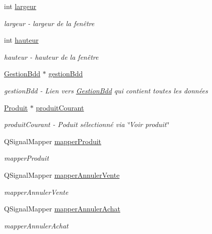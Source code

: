 \begin{DoxyCompactItemize}
int \hyperlink{class_ma_fenetre_abe37db89fd8895cc34ccc0f5cda67aaf}{largeur}
\begin{DoxyCompactList}\small\item\em largeur -\/ largeur de la fenêtre \end{DoxyCompactList}\item 
int \hyperlink{class_ma_fenetre_ae1a802d46705239d08d3bf06cd99b802}{hauteur}
\begin{DoxyCompactList}\small\item\em hauteur -\/ hauteur de la fenêtre \end{DoxyCompactList}\item 
\hyperlink{class_gestion_bdd}{Gestion\-Bdd} $\ast$ \hyperlink{class_ma_fenetre_a34d71a96cedb508c72afb02c70ff9609}{gestion\-Bdd}
\begin{DoxyCompactList}\small\item\em gestion\-Bdd -\/ Lien vers \hyperlink{class_gestion_bdd}{Gestion\-Bdd} qui contient toutes les données \end{DoxyCompactList}\item 
\hyperlink{class_produit}{Produit} $\ast$ \hyperlink{class_ma_fenetre_abc16cc0e7668b65019bffe2d595be2a0}{produit\-Courant}
\begin{DoxyCompactList}\small\item\em produit\-Courant -\/ Poduit sélectionné via \char`\"{}\-Voir produit\char`\"{} \end{DoxyCompactList}\item 
Q\-Signal\-Mapper \hyperlink{class_ma_fenetre_a7345ec3b89dedf18ae6297d77c5653b4}{mapper\-Produit}
\begin{DoxyCompactList}\small\item\em mapper\-Produit \end{DoxyCompactList}\item 
Q\-Signal\-Mapper \hyperlink{class_ma_fenetre_ade92391fa7788e74d4abd7d5755a07d2}{mapper\-Annuler\-Vente}
\begin{DoxyCompactList}\small\item\em mapper\-Annuler\-Vente \end{DoxyCompactList}\item 
Q\-Signal\-Mapper \hyperlink{class_ma_fenetre_a08695abd162e35e1cd39132032aef4ca}{mapper\-Annuler\-Achat}
\begin{DoxyCompactList}\small\item\em mapper\-Annuler\-Achat \end{DoxyCompactList}\item 

\end{DoxyCompactItemize}
